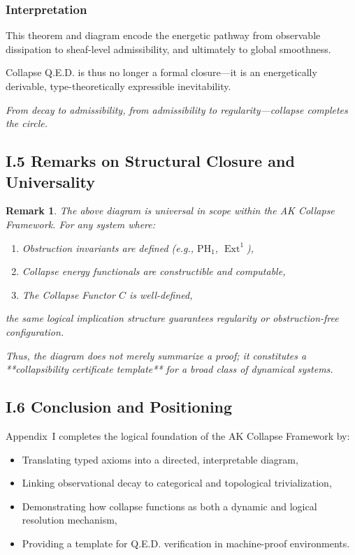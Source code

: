 \documentclass[11pt]{article}
\newtheorem{remark}[theorem]{Remark}
\DeclareMathOperator{\Ext}{Ext}
\begin{document}
\subsubsection*{Interpretation}

This theorem and diagram encode the energetic pathway from observable dissipation to sheaf-level admissibility, and ultimately to global smoothness.

Collapse Q.E.D. is thus no longer a formal closure—it is an energetically derivable, type-theoretically expressible inevitability.

\begin{center}
\textit{From decay to admissibility, from admissibility to regularity—collapse completes the circle.}
\end{center}


\subsection*{I.5 Remarks on Structural Closure and Universality}

\begin{remark}
The above diagram is universal in scope within the AK Collapse Framework. For any system where:

\begin{enumerate}
  \item Obstruction invariants are defined (e.g., $\mathrm{PH}_1$, $\Ext^1$),
  \item Collapse energy functionals are constructible and computable,
  \item The Collapse Functor $C$ is well-defined,
\end{enumerate}

the same logical implication structure guarantees regularity or obstruction-free configuration.

Thus, the diagram does not merely summarize a proof; it constitutes a **collapsibility certificate template** for a broad class of dynamical systems.
\end{remark}

\subsection*{I.6 Conclusion and Positioning}

Appendix~I completes the logical foundation of the AK Collapse Framework by:

\begin{itemize}
  \item Translating typed axioms into a directed, interpretable diagram,
  \item Linking observational decay to categorical and topological trivialization,
  \item Demonstrating how collapse functions as both a dynamic and logical resolution mechanism,
  \item Providing a template for Q.E.D. verification in machine-proof environments.
\end{itemize}
\end{document}
